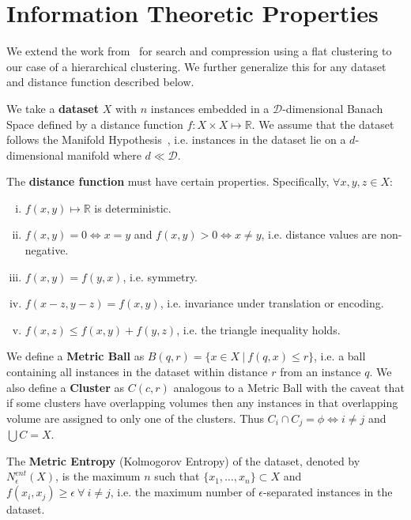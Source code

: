 \section{Information Theoretic Properties}
\label{sec:information-theoretic-properties}

We extend the work from~\cite{berger2020levenshtein} for search and compression using a flat clustering to our case of a hierarchical clustering.
We further generalize this for any dataset and distance function described below.

We take a \textbf{dataset} $X$ with $n$ instances embedded in a $\mathcal{D}$-dimensional Banach Space defined by a distance function $f: X \times X \mapsto \mathbb{R}$.
We assume that the dataset follows the Manifold Hypothesis~\cite{fefferman2016testing}, i.e. instances in the dataset lie on a $d$-dimensional manifold where $d \ll \mathcal{D}$.

The \textbf{distance function} must have certain properties.
Specifically, $\forall x, y, z \in X$:

\begin{enumerate}[i.]
    \item $f(x, y) \mapsto \mathbb{R}$ is deterministic.
    \item $f(x, y) = 0 \Leftrightarrow x = y$ and $f(x, y) > 0 \Leftrightarrow x \neq y$, i.e. distance values are non-negative.
    \item $f(x, y) = f(y, x)$, i.e. symmetry.
    \item $f(x - z, y - z) = f(x, y)$, i.e. invariance under translation or encoding.
    \item $f(x, z) \leq f(x, y) + f(y, z)$, i.e. the triangle inequality holds.
\end{enumerate}


We define a \textbf{Metric Ball} as $B(q, r) = \{ x \in X \ | \ f(q, x) \leq r \}$, i.e. a ball containing all instances in the dataset within distance $r$ from an instance $q$.
We also define a \textbf{Cluster} as $C(c, r)$ analogous to a Metric Ball with the caveat that if some clusters have overlapping volumes then any instances in that overlapping volume are assigned to only one of the clusters.
Thus $C_i \cap C_j = \phi \Leftrightarrow i \neq j$ and $\bigcup C = X$.

The \textbf{Metric Entropy} (Kolmogorov Entropy) of the dataset, denoted by $N_{\epsilon}^{ent}(X)$, is the maximum $n$ such that $\{x_1, \dots, x_n\} \subset X$ and $f(x_i, x_j) \geq \epsilon \ \forall \ i \neq j$, i.e. the maximum number of $\epsilon$-separated instances in the dataset.

